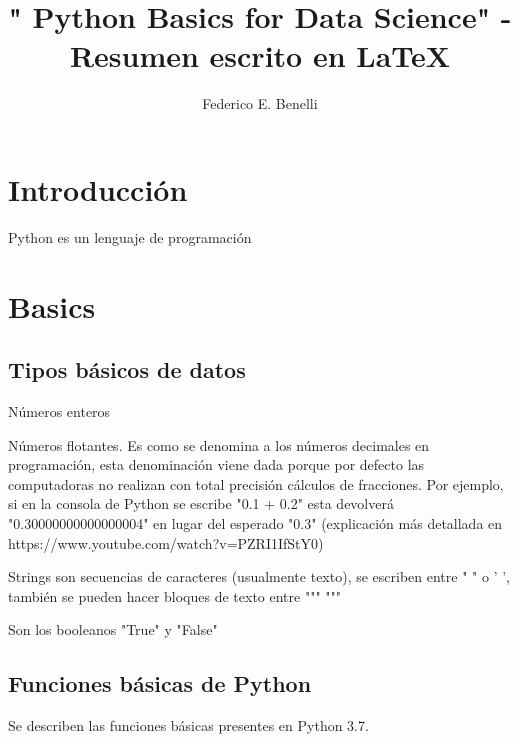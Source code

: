 \documentclass[10pt,a4paper]{article}
\author{Federico E. Benelli}
\title{" Python Basics for Data Science" - Resumen escrito en \LaTeX{}}
\begin{document}
\maketitle
\tableofcontents{}
\newpage

\section{Introducción}
Python es un lenguaje de programación

\section{Basics}

\subsection{Tipos básicos de datos}

\begin{description}[
align=right,
labelindent = 1cm,
labelsep=0.5cm,
itemindent=0cm]

\item [Integer]Números enteros
\item [Float]Números flotantes. Es como se denomina a los números decimales en programación, esta denominación viene dada porque por defecto las computadoras no realizan con total precisión cálculos de fracciones. Por ejemplo, si en la consola de Python se escribe "0.1 + 0.2" esta devolverá "0.30000000000000004" en lugar del esperado "0.3" (explicación más detallada en https://www.youtube.com/watch?v=PZRI1IfStY0)
\item [String]Strings son secuencias de caracteres (usualmente texto), se escriben entre " " o ' ', también se pueden hacer bloques de texto entre """ """
\item [Boolean] Son los booleanos "True" y "False"
\end{description}

\subsection{Funciones básicas de Python}
Se describen las funciones básicas presentes en Python 3.7. 
\end{document}
